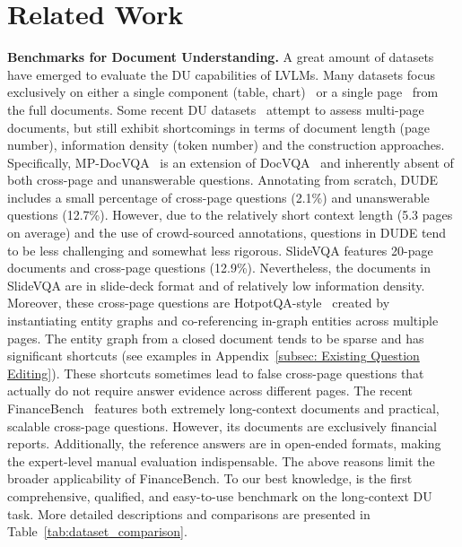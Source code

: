 \section{Related Work}
\label{sec: related_work}

\textbf{Benchmarks for Document Understanding.} A great amount of datasets have emerged to evaluate the DU capabilities of LVLMs. Many datasets focus exclusively on either a single component (\eg table, chart)~\cite{masry-etal-2022-chartqa, zhu2022towards, liu2024visualwebbench, kardas-etal-2020-axcell} or a single page~\cite{Mathew2020DocVQAAD, Mathew2021InfographicVQA} from the full documents. Some recent DU datasets~\cite{tito2023hierarchical, VanLandeghem2023DocumentUD, SlideVQA2023, saadfalcon2023pdftriage, islam2023financebench} attempt to assess multi-page documents, but still exhibit shortcomings in terms of document length (page number), information density (token number) and the construction approaches. Specifically, MP-DocVQA~\cite{tito2023hierarchical} is an extension of DocVQA~\cite{Mathew2020DocVQAAD} and inherently absent of both cross-page and unanswerable questions. Annotating from scratch, DUDE~\cite{VanLandeghem2023DocumentUD} includes a small percentage of cross-page questions (2.1\%) and unanswerable questions (12.7\%). However, due to the relatively short context length (5.3 pages on average) and the use of crowd-sourced annotations, questions in DUDE tend to be less challenging and somewhat less rigorous. SlideVQA features 20-page documents and cross-page questions (12.9\%). Nevertheless, the documents in SlideVQA are in slide-deck format and of relatively low information density. Moreover, these cross-page questions are HotpotQA-style~\cite{yang-etal-2018-hotpotqa} created by instantiating entity graphs and co-referencing in-graph entities across multiple pages. The entity graph from a closed document tends to be sparse and has significant shortcuts (see examples in Appendix~\ref{subsec: Existing Question Editing}). These shortcuts sometimes lead to false cross-page questions that actually do not require answer evidence across different pages. The recent FinanceBench~\cite{islam2023financebench} features both extremely long-context documents and practical, scalable cross-page questions. However, its documents are exclusively financial reports. Additionally, the reference answers are in open-ended formats, making the expert-level manual evaluation indispensable. The above reasons limit the broader applicability of FinanceBench. To our best knowledge, \benchmarkname is the first comprehensive, qualified, and easy-to-use benchmark on the long-context DU task. More detailed descriptions and comparisons are presented in Table~\ref{tab:dataset_comparison}.

